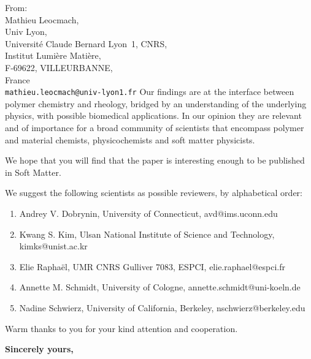 \documentclass[a4paper, parskip=true, firsthead=false, fromemail=true, foldmarks=false]{scrlttr2}
\newcommand{\journal}{Soft Matter}
\begin{document}
\begin{letter}{From:\\
Mathieu Leocmach,\\
Univ Lyon,\\ 
Universit\'e Claude Bernard Lyon~1, CNRS,\\
Institut Lumi\`ere Mati\`ere,\\
F-69622, VILLEURBANNE,\\
France\\
\texttt{mathieu.leocmach@univ-lyon1.fr}
}
Our findings are at the interface between polymer chemistry and rheology, bridged by an understanding of the underlying physics, with possible biomedical applications. In our opinion they are relevant and of importance for a broad community of scientists that encompass polymer and material chemists, physicochemists and soft matter physicists.

We hope that you will find that the paper is interesting enough to be published in \journal. 

We suggest the following scientists as possible reviewers, by alphabetical order:
\begin{enumerate} \setlength\itemsep{0em}
\item Andrey V. Dobrynin, University of Connecticut, 
avd@ims.uconn.edu
\item Kwang S. Kim, Ulsan National Institute of Science and Technology, kimks@unist.ac.kr
\item Elie Raphaël, UMR CNRS Gulliver 7083, ESPCI, elie.raphael@espci.fr
\item Annette M. Schmidt, University of Cologne, annette.schmidt@uni-koeln.de
\item Nadine Schwierz, University of California, Berkeley, nschwierz@berkeley.edu
\end{enumerate}


Warm thanks to you for your kind attention and cooperation. 


\closing{\bf Sincerely yours,} 

\end{letter} 
\end{document}
